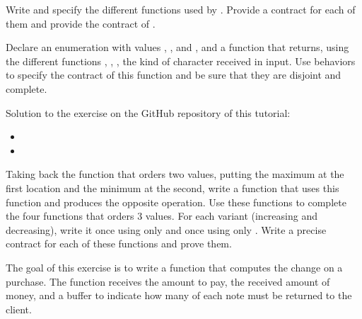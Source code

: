 Write and specify the different functions used by
. Provide a contract for each of them and
provide the contract of .





Declare an enumeration with values , ,
 and , and a function
 that returns, using the different
functions , ,
, the kind of character received in input. Use
behaviors to specify the contract of this function and be sure that
they are disjoint and complete.


\begin{Information}
  Solution to the exercise on the GitHub repository of this tutorial:
  \begin{itemize}
    \item {}
    \item {}
  \end{itemize}
\end{Information}



\label{l4:contract-modularity-ex-order-3}


Taking back the function  that orders two values,
putting the maximum at the first location and the minimum at the second,
write a function  that uses this function and
produces the opposite operation. Use these functions to complete the
four functions that orders 3 values. For each variant (increasing and
decreasing), write it once using only  and once
using only . Write a precise contract for each of
these functions and prove them.









The goal of this exercise is to write a function that computes the change
on a purchase. The function  receives the amount
to pay, the received amount of money, and a buffer to indicate how
many of each note must be returned to the client.


